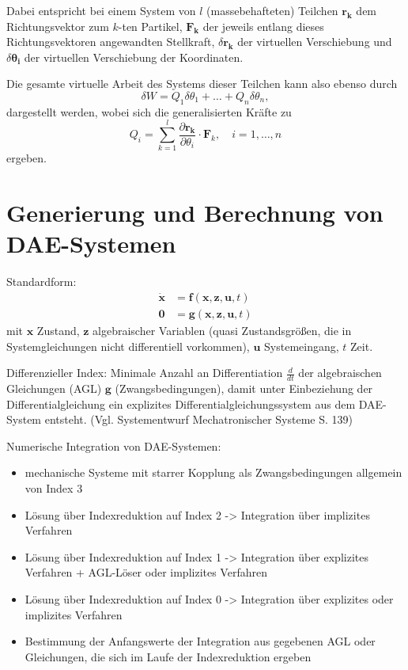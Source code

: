 Dabei entspricht bei einem System von $l$ (massebehafteten) Teilchen $\pmb{r_k}$ dem Richtungsvektor zum $k$-ten Partikel, $\pmb{F_k}$ der jeweils entlang dieses Richtungsvektoren angewandten Stellkraft, $\delta \pmb{r_{k}}$ der virtuellen Verschiebung und $\delta \pmb{\theta_{i}}$ der virtuellen Verschiebung der Koordinaten.

Die gesamte virtuelle Arbeit des Systems dieser Teilchen kann also ebenso durch
\begin{equation}
\delta W = Q_1 \delta \theta_1 + \ldots + Q_n\delta \theta_n,
\end{equation}
dargestellt werden, wobei sich die generalisierten Kräfte zu
\begin{equation}
Q_i = \sum_{k=1}^l \frac {\partial \pmb{r_k}} {\partial \theta_i} \cdot \mathbf {F}_{k}  ,\quad i=1,\ldots, n 
\end{equation}
ergeben.
\section{Generierung und Berechnung von DAE-Systemen}
Standardform:
	\begin{align}\label{eq:dae_std}
		\pmb{\dot{x}} &= \pmb{f}(\pmb{x}, \pmb{z}, \pmb{u}, t) \\
		\pmb{0} &= \pmb{g}(\pmb{x}, \pmb{z}, \pmb{u}, t)
	\end{align}
mit $\pmb{x}$ Zustand, $\pmb{z}$ algebraischer Variablen (quasi Zustandsgrößen, die in Systemgleichungen nicht differentiell vorkommen), $\pmb{u}$ Systemeingang, $t$ Zeit.

Differenzieller Index: Minimale Anzahl an Differentiation $\frac{d}{dt}$ der algebraischen Gleichungen (AGL) $\pmb{g}$ (Zwangsbedingungen), damit unter Einbeziehung der Differentialgleichung ein explizites Differentialgleichungssystem aus dem DAE-System entsteht. (Vgl. Systementwurf Mechatronischer Systeme S. 139)

Numerische Integration von DAE-Systemen: 
\begin{itemize}
\item mechanische Systeme mit starrer Kopplung als Zwangsbedingungen allgemein von Index 3
\item Lösung über Indexreduktion auf Index 2 -> Integration über implizites Verfahren
\item Lösung über Indexreduktion auf Index 1 -> Integration über explizites Verfahren + AGL-Löser oder implizites Verfahren
\item Lösung über Indexreduktion auf Index 0 -> Integration über explizites oder implizites Verfahren
\item Bestimmung der Anfangswerte der Integration aus gegebenen AGL oder Gleichungen, die sich im Laufe der Indexreduktion ergeben
\end{itemize}

